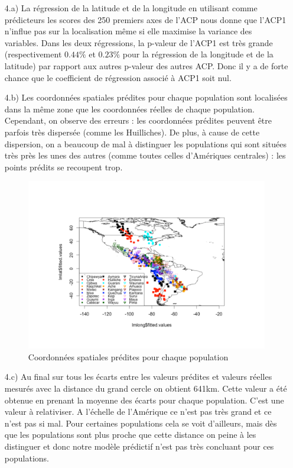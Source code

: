 \documentclass[a4paper, 12pt]{article}
\begin{document}
\begin{enumerate}
\setlength{\itemsep}{12pt}

\item[4.a)]
La régression de la latitude et de la longitude en utilisant comme prédicteurs les scores des 250 premiers axes de l'ACP nous donne que l'ACP1 n'influe pas sur la localisation même si elle maximise la variance des variables. Dans les deux régressions, la p-valeur de l'ACP1 est très grande (respectivement $0.44\%$ et $0.23\%$ pour la régression de la longitude et de la latitude) par rapport aux autres p-valeur des autres ACP. Donc il y a de forte chance que le coefficient de régression associé à ACP1 soit nul. 

\item[4.b)] 
Les coordonnées spatiales prédites pour chaque population sont localisées dans la même zone que les coordonnées réelles de chaque population. Cependant, on observe des erreurs : les coordonnées prédites peuvent être parfois très dispersée (comme les Huilliches). De plus, à cause de cette dispersion, on a beaucoup de mal à distinguer les populations qui sont situées très près les unes des autres (comme toutes celles d'Amériques centrales) : les points prédits se recoupent trop.

\begin{figure}[!h]
\begin{center}
\includegraphics[scale=0.5]{Plot4b.pdf}
\caption{Coordonnées spatiales prédites pour chaque population}
\end{center}
\end{figure}

\item[4.c)]
Au final sur tous les écarts entre les valeurs prédites et valeurs réelles mesurés avec la distance du grand cercle on obtient 641km. Cette valeur a été obtenue en prenant la moyenne des écarts pour chaque population. C'est une valeur à relativiser. A l'échelle de l'Amérique ce n'est pas très grand et ce n'est pas si mal. Pour certaines populations cela se voit d'ailleurs, mais dès que les populations sont plus proche que cette distance on peine à les distinguer et donc notre modèle prédictif n'est pas très concluant pour ces populations.

\end{enumerate}
\end{document}
